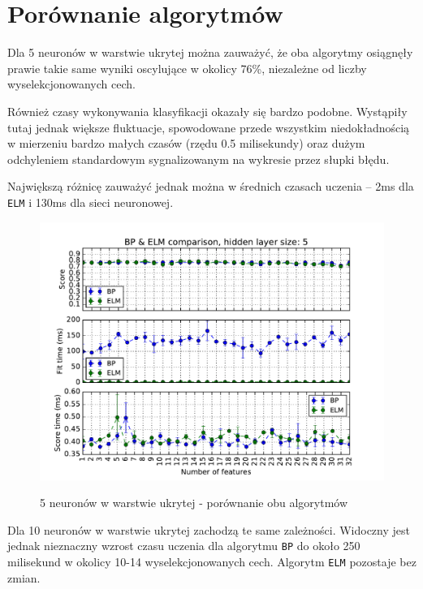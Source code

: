 \section{Porównanie algorytmów}

Dla 5 neuronów w warstwie ukrytej można zauważyć, że oba algorytmy osiągnęły prawie takie same wyniki oscylujące w okolicy 76\%, niezależne od liczby wyselekcjonowanych cech.

Również czasy wykonywania klasyfikacji okazały się bardzo podobne.
Wystąpiły tutaj jednak większe fluktuacje, spowodowane przede wszystkim niedokładnością w mierzeniu bardzo małych czasów (rzędu 0.5 milisekundy) oraz dużym odchyleniem standardowym sygnalizowanym na wykresie przez słupki błędu.

Największą różnicę zauważyć jednak można w średnich czasach uczenia -- 2ms dla \texttt{ELM} i 130ms dla sieci neuronowej.

\begin{figure}[h!]
	\centering
	\includegraphics[width=1.0\linewidth]{img/bp_elm_5.pdf}
	\label{Rysunek}
	\caption{5 neuronów w warstwie ukrytej - porównanie obu algorytmów}
\end{figure}

\newpage

Dla 10 neuronów w warstwie ukrytej zachodzą te same zależności. Widoczny jest jednak nieznaczny wzrost czasu uczenia dla algorytmu \texttt{BP} do około 250 milisekund w okolicy 10-14 wyselekcjonowanych cech. Algorytm \texttt{ELM} pozostaje bez zmian.

